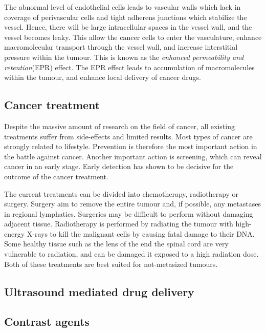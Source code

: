 The abnormal level of endothelial cells leads to vascular walls which lack in coverage of perivascular cells and tight adherens junctions which stabilize the vessel. Hence, there will be large intracellular spaces in the vessel wall, and the vessel becomes leaky. This allow the cancer cells to enter the vasculature, enhance macromolecular transport through the vessel wall, and increase interstitial pressure within the tumour. This is known as the \textit{enhanced permeability and retention}(EPR) effect. The EPR effect leads to accumulation of macromolecules within the tumour, and enhance local delivery of cancer drugs.



\subsection{Cancer treatment}
Despite the massive amount of research on the field of cancer, all existing treatments suffer from side-effects and limited results. Most types of cancer are strongly related to lifestyle. Prevention is therefore the most important action in the battle against cancer. Another important action is screening, which can reveal cancer in an early stage. Early detection has shown to be decisive for the outcome of the cancer treatment\cite{king2006cancer}\cite{Jordan1986}.

The current treatments can be divided into chemotherapy, radiotherapy or surgery. Surgery aim to remove the entire tumour and, if possible, any metastases in regional lymphatics. Surgeries may be difficult to perform without damaging adjacent tissue. Radiotherapy is performed by radiating the tumour with high-energy X-rays to kill the malignant cells by causing fatal damage to their DNA. Some healthy tissue such as the lens of the end the spinal cord are very vulnerable to radiation, and can be damaged it exposed to a high radiation dose. Both of these treatments are best suited for not-metasized tumours.  

\subsection{Ultrasound mediated drug delivery}



\subsection{Contrast agents}
\label{contrast agents}

